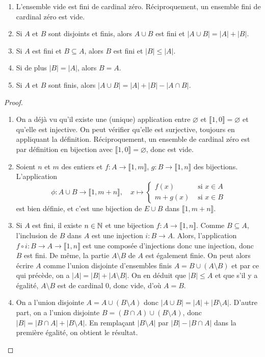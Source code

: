 \begin{proposition}
\begin{enumerate}
\item L'ensemble vide est fini de cardinal zéro. Réciproquement, un ensemble fini de cardinal zéro est vide.
\item Si $A$ et $B$ sont disjoints et finis, alors $A\cup B$ est fini et $|A\cup B|=|A|+|B|$.
\item  Si $A$ est fini et $B \subseteq A$, alors $B$ est fini et $|B| \leq |A|$.
\item Si de plus $|B| = |A|$, alors $B=A$.
\item Si $A$ et $B$ sont finis, alors $|A\cup B| = |A| + |B| - |A\cap B|$.
\end{enumerate}
\end{proposition}
\begin{proof}
\begin{enumerate}
\item On a déjà vu qu'il existe une (unique) application entre $\varnothing$ et $\llbracket 1,0\rrbracket=\varnothing$ et qu'elle est injective. On peut vérifier qu'elle est surjective, toujours en appliquant la définition. Réciproquement, un ensemble de cardinal zéro est par définition en bijection avec $\llbracket 1,0\rrbracket = \varnothing$, donc est vide.
\item Soient $n$ et $m$ des entiers et $f : A\to \llbracket 1,m\rrbracket$, $g : B\to \llbracket 1,n\rrbracket$ des bijections. L'application 
\[
\phi : A\cup B \to \llbracket 1,m+n\rrbracket, \quad x\mapsto
\begin{cases}
f(x) & \text{ si }x\in A\\
m+g(x) & \text{ si }x\in B
\end{cases}
\]
est bien définie, et c'est une bijection de $E\cup B$ dans $\llbracket 1,m+n\rrbracket$.
\item Si $A$ est fini, il existe $n\in \mathbb{N}$ et une bijection $f : A\to \llbracket 1,n\rrbracket$. Comme $B\subseteq A$, l'inclusion de $B$ dans $A$ est une injection $i : B\to A$. Alors, l'application $f\circ i : B\to A\to \llbracket 1,n\rrbracket$ est une composée d'injections donc une injection, donc $B$ est fini. De même, la partie $A\setminus B$ de $A$ est également finie. On peut alors écrire $A$ comme l'union disjointe d'ensembles finis $A=B \cup (A\setminus B)$ et par ce qui précède, on a $|A|=|B|+|A\setminus B|$. On en déduit que $|B|\leq A$ et que s'il y a égalité, $A\setminus B$ est de cardinal $0$, donc vide, d'où $A=B$.
\item On a l'union disjointe $A = A\cup (B\setminus A)$  donc $|A\cup B| = |A|+|B\setminus A|$.
D'autre part, on a l'union disjointe $B = (B\cap A) \cup (B\setminus A)$, donc $|B| = |B\cap A|+|B\setminus A|$.
En remplaçant $|B\setminus A|$ par $|B|-|B\cap A|$ dans la première égalité, on obtient le résultat.
\end{enumerate}
\end{proof}


